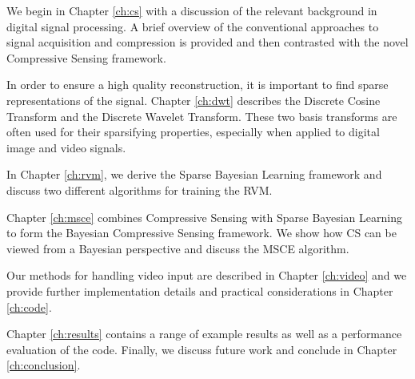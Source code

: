 We begin in Chapter \ref{ch:cs} with a discussion of the relevant background in digital signal processing.
A brief overview of the conventional approaches to signal acquisition and compression is provided and then contrasted with the novel Compressive Sensing framework.

In order to ensure a high quality reconstruction, it is important to find sparse representations of the signal.
Chapter \ref{ch:dwt} describes the Discrete Cosine Transform and the Discrete Wavelet Transform.
These two basis transforms are often used for their sparsifying properties, especially when applied to digital image and video signals.

In Chapter \ref{ch:rvm}, we derive the Sparse Bayesian Learning framework and discuss two different algorithms for training the RVM.

Chapter \ref{ch:msce} combines Compressive Sensing with Sparse Bayesian Learning to form the Bayesian Compressive Sensing framework.
We show how CS can be viewed from a Bayesian perspective and discuss the MSCE algorithm.

Our methods for handling video input are described in Chapter \ref{ch:video} and we provide further implementation details and practical considerations in Chapter \ref{ch:code}.

Chapter \ref{ch:results} contains a range of example results as well as a performance evaluation of the code.
Finally, we discuss future work and conclude in Chapter \ref{ch:conclusion}.

